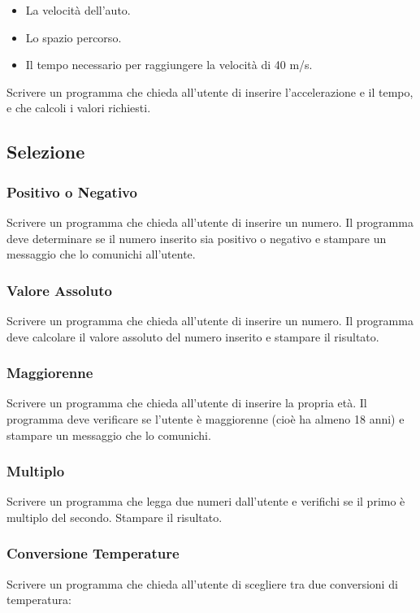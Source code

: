 \documentclass[a4paper,12pt]{article}
\begin{document}
	\begin{itemize}
		\item 	La velocità dell’auto.
		\item 	Lo spazio percorso.
		\item 	Il tempo necessario per raggiungere la velocità di 40 m/s.
	\end{itemize}
	
	
	Scrivere un programma che chieda all’utente di inserire l’accelerazione e il tempo, e che calcoli i valori richiesti.
	
	
	
	\newpage
	
	\subsection{Selezione}
	
	\subsubsection{Positivo o Negativo}
	
	Scrivere un programma che chieda all’utente di inserire un numero. Il programma deve determinare se il numero inserito sia positivo o negativo e stampare un messaggio che lo comunichi all’utente.
	
	
	\subsubsection{Valore Assoluto}
	Scrivere un programma che chieda all’utente di inserire un numero. Il programma deve calcolare il valore assoluto del numero inserito e stampare il risultato.
	
	\subsubsection{Maggiorenne}
	Scrivere un programma che chieda all’utente di inserire la propria età. Il programma deve verificare se l’utente è maggiorenne (cioè ha almeno 18 anni) e stampare un messaggio che lo comunichi.
	
	
	\subsubsection{Multiplo}
	Scrivere un programma che legga due numeri dall’utente e verifichi se il primo è multiplo del secondo. Stampare il risultato.
	
	
	\subsubsection{Conversione Temperature}
	Scrivere un programma che chieda all’utente di scegliere tra due conversioni di temperatura:
	
\end{document}
